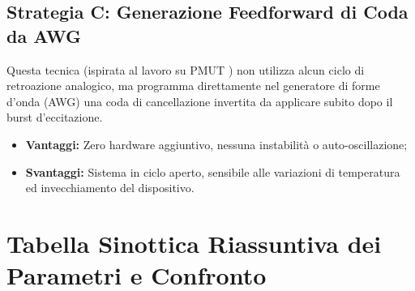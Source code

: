 \documentclass[11pt,a4paper]{article}
\begin{document}
\subsection{Strategia C: Generazione Feedforward di Coda da AWG}
Questa tecnica (ispirata al lavoro su PMUT \cite{Wu2021}) non utilizza alcun ciclo di retroazione analogico, ma programma direttamente nel generatore di forme d'onda (AWG) una coda di cancellazione invertita da applicare subito dopo il burst d'eccitazione.
\begin{itemize}
    \item \textbf{Vantaggi:} Zero hardware aggiuntivo, nessuna instabilità o auto-oscillazione;
    \item \textbf{Svantaggi:} Sistema in ciclo aperto, sensibile alle variazioni di temperatura ed invecchiamento del dispositivo.
\end{itemize}

\newpage

\section{Tabella Sinottica Riassuntiva dei Parametri e Confronto}
\end{document}
